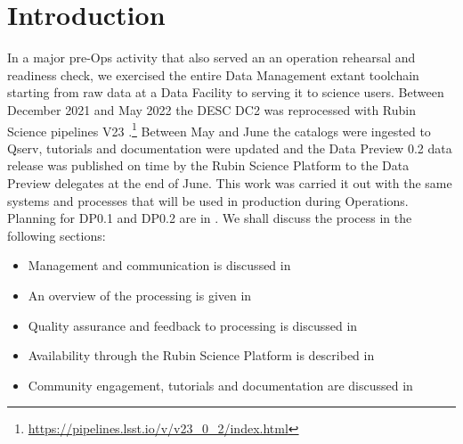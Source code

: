 \section{Introduction}\label{sec:intro}

In a major pre-Ops activity that also served an an operation rehearsal and readiness check, we exercised the entire Data Management extant toolchain starting from raw data at a Data Facility to serving it to science users. Between December 2021 and May 2022 the DESC DC2 \citep{2021ApJS..253...31L} was reprocessed with Rubin Science pipelines V23 .\footnote{\url{https://pipelines.lsst.io/v/v23_0_2/index.html}}
Between May and June the catalogs were ingested to Qserv, tutorials and documentation were updated and the Data Preview 0.2 data release was published on time by the Rubin Science Platform to the Data Preview delegates at the end of June.
This work was carried it out with the same systems and processes that will be used in production during Operations.
Planning for DP0.1 and DP0.2 are in .
We shall discuss the process in the following sections:

\begin{itemize}
\item  Management and communication is discussed in 
\item An overview of the processing is given in 
\item Quality assurance and feedback to processing is discussed in  
\item Availability through the Rubin Science Platform is described in 
\item Community engagement, tutorials and documentation are discussed in 
\end{itemize}

